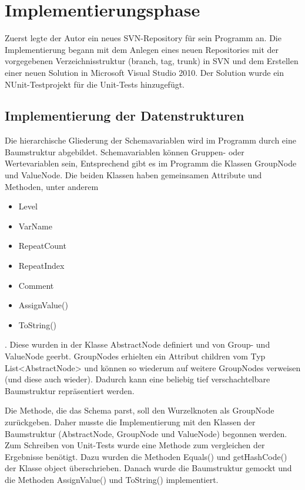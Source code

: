 \section{Implementierungsphase} 
\label{sec:Implementierungsphase}
Zuerst legte der Autor ein neues SVN-Repository für sein Programm an.
Die Implementierung begann mit dem Anlegen eines neuen Repositories mit der vorgegebenen Verzeichnisstruktur (branch, tag, trunk) in SVN und dem Erstellen einer neuen Solution in Microsoft Visual Studio 2010. Der Solution wurde ein NUnit-Testprojekt für die Unit-Tests hinzugefügt.

\subsection{Implementierung der Datenstrukturen}
\label{sec:ImplementierungDatenstrukturen}
Die hierarchische Gliederung der Schemavariablen wird im Programm durch eine Baumstruktur abgebildet. Schemavariablen können Gruppen- oder Wertevariablen sein, Entsprechend gibt es im Programm die Klassen GroupNode und ValueNode. Die  beiden Klassen haben gemeinsamen Attribute und Methoden, unter anderem
\begin{itemize}
\item Level
\item VarName
\item RepeatCount
\item RepeatIndex
\item Comment
\item AssignValue()
\item ToString()
\end{itemize}. Diese wurden in der Klasse AbstractNode definiert und von Group- und ValueNode geerbt.
GroupNodes erhielten ein Attribut children vom Typ List<AbstractNode> und können so wiederum auf weitere GroupNodes verweisen (und diese auch wieder). Dadurch kann eine beliebig tief verschachtelbare Baumstruktur repräsentiert werden. 


Die Methode, die das Schema parst, soll den Wurzelknoten als GroupNode zurückgeben. Daher musste die Implementierung mit den Klassen der Baumstruktur (AbstractNode, GroupNode und ValueNode) begonnen werden. Zum Schreiben von Unit-Tests wurde eine Methode zum vergleichen der Ergebnisse benötigt. Dazu wurden die Methoden Equals() und getHashCode() der Klasse object überschrieben. Danach wurde die Baumstruktur gemockt und die Methoden AssignValue() und ToString() implementiert.

